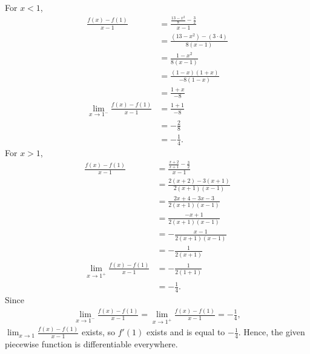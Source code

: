 \documentclass[12pt]{article}
\begin{document}
For $x<1$,
\begin{align*}
    \frac{f(x)-f(1)}{x-1} &= \frac{\frac{13-x^2}{8}-\frac{3}{2}}{x-1}\\
    &=\frac{(13-x^2)-(3\cdot 4)}{8(x-1)}\\
    &=\frac{1-x^2}{8(x-1)}\\
    &=\frac{(1-x)(1+x)}{-8(1-x)}\\
    &=\frac{1+x}{-8}\\
    \lim_{x\to 1^-}\frac{f(x)-f(1)}{x-1} &= \frac{1+1}{-8}\\
    &= -\frac{2}{8}\\
    &= -\frac{1}{4}.
\end{align*}
For $x>1$, 
\begin{align*}
    \frac{f(x)-f(1)}{x-1} &= \frac{\frac{x+2}{x+1}-\frac{3}{2}}{x-1}\\
    &= \frac{2(x+2)-3(x+1)}{2(x+1)(x-1)}\\
    &= \frac{2x+4-3x-3}{2(x+1)(x-1)}\\
    &= \frac{-x+1}{2(x+1)(x-1)}\\
    &= -\frac{x-1}{2(x+1)(x-1)}\\
    &= -\frac{1}{2(x+1)}\\
    \lim_{x\to 1^+}\frac{f(x)-f(1)}{x-1} &= -\frac{1}{2(1+1)}\\
    &= -\frac{1}{4}.
\end{align*}
Since
\begin{align*}
    \lim_{x\to 1^-}\frac{f(x)-f(1)}{x-1} = \lim_{x\to 1^+}\frac{f(x)-f(1)}{x-1} = -\frac{1}{4},
\end{align*}
$\lim_{x\to 1}\frac{f(x)-f(1)}{x-1}$ exists, so $f'(1)$ exists and is equal to $-\frac{1}{4}$. Hence, the given piecewise function is differentiable everywhere.

\newpage
\end{document}
